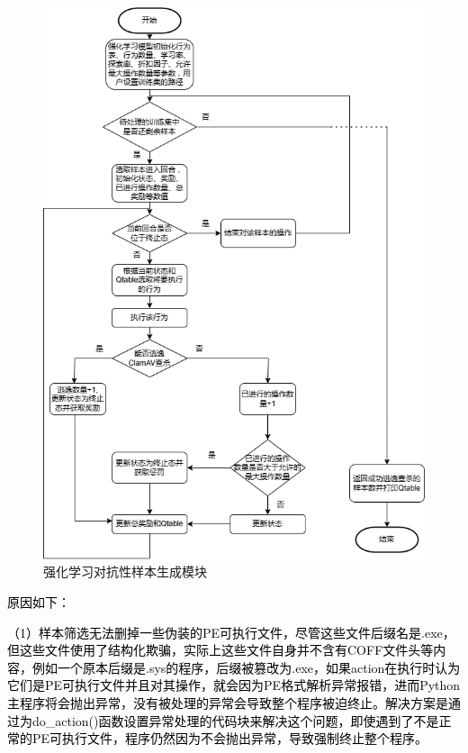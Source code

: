 \begin{figure}[htbp]
  \centering
  \includegraphics[scale=0.70]{images/reinforcement_learning_adversarial_sample_generation_module.png}
  \caption{强化学习对抗性样本生成模块}\label{fig:reinforcement_learning_adversarial_sample_generation_module}
\end{figure}

\textcolor{black}{原因如下：}

\textcolor{black}{（1）样本筛选无法删掉一些伪装的PE可执行文件，尽管这些文件后缀名是.exe，但这些文件使用了结构化欺骗，实际上这些文件自身并不含有COFF文件头等内容，例如一个原本后缀是.sys的程序，后缀被篡改为.exe，如果action在执行时认为它们是PE可执行文件并且对其操作，就会因为PE格式解析异常报错，进而Python主程序将会抛出异常，没有被处理的异常会导致整个程序被迫终止。解决方案是通过为do\_action()函数设置异常处理的代码块来解决这个问题，即使遇到了不是正常的PE可执行文件，程序仍然因为不会抛出异常，导致强制终止整个程序。}

